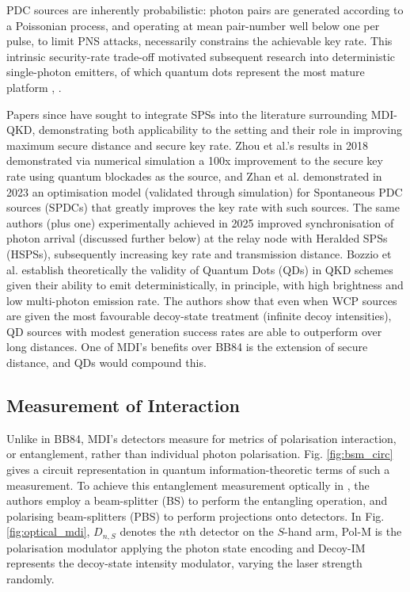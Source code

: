\documentclass[9pt,technote]{IEEEtran}
\begin{document}
PDC sources are inherently probabilistic: photon pairs are generated according to a Poissonian process, and operating at mean pair-number well below one per pulse, to limit PNS attacks, necessarily constrains the achievable key rate. This intrinsic security-rate trade-off motivated subsequent research into deterministic single-photon emitters, of which quantum dots represent the most mature platform \cite{Bozzio_2022}, \cite{Yang_2024}.

Papers since have sought to integrate SPSs into the literature surrounding MDI-QKD, demonstrating both applicability to the setting and their role in improving maximum secure distance and secure key rate. Zhou et al.'s results \cite{Zhou_2018} in 2018 demonstrated via numerical simulation a 100x improvement to the secure key rate using quantum blockades as the source, and Zhan et al. demonstrated \cite{Zhan2023} in 2023 an optimisation model (validated through simulation) for Spontaneous PDC sources (SPDCs) that greatly improves the key rate with such sources. The same authors (plus one) experimentally achieved in 2025 improved synchronisation of photon arrival (discussed further below) at the relay node \cite{Zhan2025} with Heralded SPSs (HSPSs), subsequently increasing key rate and transmission distance. Bozzio et al. establish theoretically the validity of Quantum Dots (QDs) in QKD schemes \cite{Bozzio_2022} given their ability to emit deterministically, in principle, with high brightness and low multi-photon emission rate. The authors show that even when WCP sources are given the most favourable decoy-state treatment (infinite decoy intensities), QD sources with modest generation success rates are able to outperform over long distances. One of MDI's benefits over BB84 is the extension of secure distance, and QDs would compound this.

\subsection*{Measurement of Interaction}
\label{sect:interaction}
Unlike in BB84, MDI's detectors measure for metrics of polarisation interaction, or entanglement, rather than individual photon polarisation. Fig. \ref{fig:bsm_circ} gives a circuit representation in quantum information-theoretic terms of such a measurement. To achieve this entanglement measurement optically in \cite{Lo_2012}, the authors employ a beam-splitter (BS) to perform the entangling operation, and polarising beam-splitters (PBS) to perform projections onto detectors. In Fig. \ref{fig:optical_mdi}, $D_{n,S}$ denotes the $n$th detector on the $S$-hand arm, Pol-M is the polarisation modulator applying the photon state encoding and Decoy-IM represents the decoy-state intensity modulator, varying the laser strength randomly.
\end{document}
